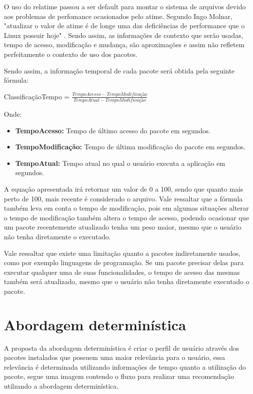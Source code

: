 O uso do relatime passou a ser default para montar o sistema de arquivos devido
aos problemas de perfomance ocasionados pelo atime. Segundo Ingo Molnar, "atualizar o valor
de atime é de longe uma das deficiências de performance que o Linux possuir
hoje" \cite{3_corbet_2007}. Sendo assim, as informações de contexto que serão
usadas, tempo de acesso, modificação e mudança, são aproximações e assim não
refletem perfeitamente o contexto de uso dos pacotes.

Sendo assim, a informação temporal de cada pacote será obtida pela seguinte
fórmula:

ClassificaçãoTempo = $\frac{TempoAcesso - TempoModificação}{TempoAtual -
TempoModificação}$


Onde:

\begin{itemize}
    \item \textbf{TempoAcesso:} Tempo de último acesso do pacote em segundos.
    \item \textbf{TempoModificação:} Tempo de última modificação do pacote em
        segundos.
    \item \textbf{TempoAtual:} Tempo atual no qual o usuário executa a
        aplicação em segundos.
\end{itemize}


A equação apresentada irá retornar um valor de 0 a 100, sendo que quanto mais
perto de 100, mais recente é considerado o arquivo. Vale ressaltar que a fórmula
também leva em conta o tempo de modificação, pois em algumas situações alterar o
tempo de modificação também altera o tempo de acesso, podendo ocasionar que um
pacote recentemente atualizado tenha um peso maior, mesmo que o usuário não
tenha diretamente o executado.

Vale ressaltar que existe uma limitação quanto a pacotes indiretamente usados,
como por exemplo linguagens de programação. Se um pacote precisar delas para
executar qualquer uma de suas funcionalidades, o tempo de acesso das mesmas
também será atualizado, mesmo que o usuário não tenha diretamente executado o
pacote.


\section{Abordagem determinística}

A proposta da abordagem determinística é criar o perfil de usuário através
dos pacotes instalados que possuem uma maior relevância para o usuário,
essa relevância é determinada utilizando informações de tempo quanto a
utilização do pacote, segue uma imagem contendo o fluxo para realizar uma
recomendação utilzando a abordagem determinística.

